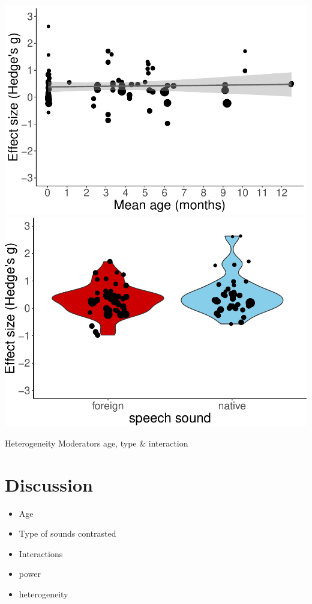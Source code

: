 \documentclass[man]{apa6}
\providecommand{\tightlist}{%
  \setlength{\itemsep}{0pt}\setlength{\parskip}{0pt}}
\begin{document}
\includegraphics{MA_speech_pref_files/figure-latex/plots-4.pdf}
\includegraphics{MA_speech_pref_files/figure-latex/plots-5.pdf}

Heterogeneity Moderators age, type \& interaction

\section{Discussion}\label{discussion}

\begin{itemize}
\tightlist
\item
  Age
\item
  Type of sounds contrasted
\item
  Interactions
\item
  power
\item
  heterogeneity
\end{itemize}
\end{document}
